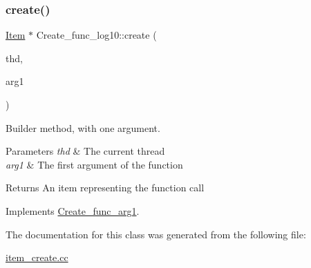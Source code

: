 \subsubsection{\texorpdfstring{create()}{create()}}
{\footnotesize\ttfamily \mbox{\hyperlink{classItem}{Item}} $\ast$ Create\+\_\+func\+\_\+log10\+::create (\begin{DoxyParamCaption}\item[{T\+HD $\ast$}]{thd,  }\item[{\mbox{\hyperlink{classItem}{Item}} $\ast$}]{arg1 }\end{DoxyParamCaption})\hspace{0.3cm}{\ttfamily [virtual]}}

Builder method, with one argument. 
\begin{DoxyParams}{Parameters}
{\em thd} & The current thread \\
\hline
{\em arg1} & The first argument of the function \\
\hline
\end{DoxyParams}
\begin{DoxyReturn}{Returns}
An item representing the function call 
\end{DoxyReturn}


Implements \mbox{\hyperlink{classCreate__func__arg1_a3e9a98f755cd82c3e762e334c955a8c9}{Create\+\_\+func\+\_\+arg1}}.



The documentation for this class was generated from the following file\+:\begin{DoxyCompactItemize}
\item 
\mbox{\hyperlink{item__create_8cc}{item\+\_\+create.\+cc}}\end{DoxyCompactItemize}
